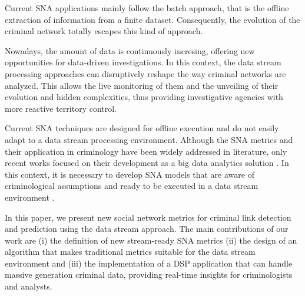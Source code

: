 Current SNA applications mainly follow the batch approach, that is the offline extraction of information from a finite dataset.
%
Consequently, the evolution of the criminal network totally escapes this kind of approach.


Nowadays, the amount of data is continuously incresing, offering new opportunities for data-driven investigations. 
%
In this context, the data stream processing approaches can disruptively reshape the way criminal networks are analyzed. 
%
This allows the live monitoring of them and the unveiling of their evolution and hidden complexities, thus providing investigative agencies with more reactive territory control.




Current SNA techniques are designed for offline execution and do not easily adapt to a data stream processing environment.
%
Although the SNA metrics and their application in criminology have been widely addressed in literature, only recent works focused on their development as a big data analytics solution \cite{pramanik2016framework}.
%
In this context, it is necessary to develop SNA models that are aware of criminological assumptions and ready to be executed in a data stream environment \cite{xu2005criminal,xu2004analyzing}.


In this paper, we present new social network metrics for criminal link detection and prediction using the data stream approach.
%
The main contributions of our work are
(i) the definition of new stream-ready SNA metrics
(ii) the design of an algorithm that makes traditional metrics suitable for the data stream environment and
(iii) the implementation of a DSP application that can handle massive generation criminal data, providing real-time insights for criminologists and analysts.

